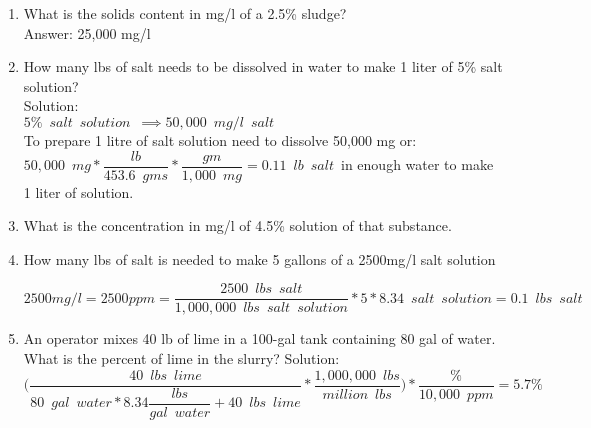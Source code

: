 \documentclass{article}
\begin{document}
\begin{enumerate}

\item What is the solids content in mg/l of a 2.5\% sludge?\\
Answer:  25,000 mg/l\\

\item How many lbs of salt needs to be dissolved in water to make 1 liter of 5\% salt solution?\\
Solution:\\
$5\% \enspace salt \enspace solution \enspace \implies 50,000 \enspace mg/l \enspace salt$\\
To prepare 1 litre of salt solution need to dissolve 50,000 mg or:\\
$50,000 \enspace mg*\dfrac{lb}{453.6 \enspace gms}*\dfrac{gm}{1,000 \enspace mg}=\boxed{0.11 \enspace lb \enspace salt}\enspace$in enough  water to make 1 liter of solution.\\

\item What is the concentration in mg/l of  4.5\% solution of that substance.

\item How many lbs of salt is needed to make 5 gallons of a 2500mg/l salt solution

$2500mg/l = 2500ppm = \dfrac{2500 \enspace lbs \enspace salt}{1,000,000 \enspace lbs \enspace salt \enspace solution}*5*8.34 \enspace salt \enspace solution=\boxed{0.1 \enspace lbs \enspace salt }$


\item An operator mixes 40 lb of lime in a 100-gal tank containing 80 gal of water. What is the percent of lime in the slurry?
\vspace{0.2cm}
Solution:\\
\vspace{0.2cm}
$\Bigg(\dfrac{40 \enspace lbs \enspace lime}{80 \enspace gal \enspace water*8.34\dfrac{lbs}{gal \enspace water}+40\enspace lbs \enspace lime}*\dfrac{1,000,000 \enspace lbs}{million \enspace lbs}\Bigg)*\dfrac{\%}{10,000 \enspace ppm}=\boxed{5.7\%}$
\end{enumerate}
\end{document}
